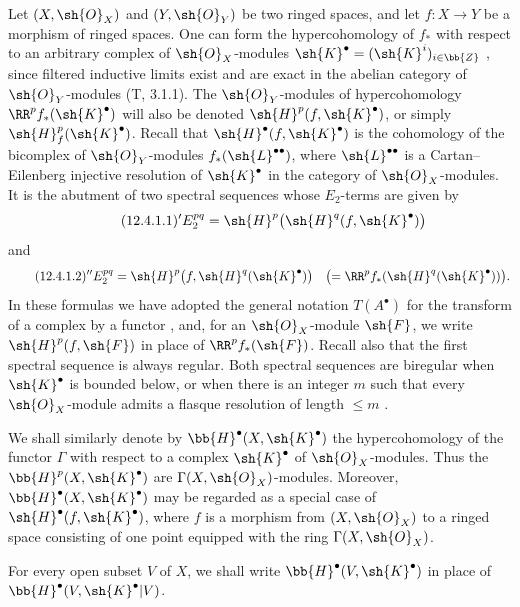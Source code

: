 \begin{env}[12.4.1]
\label{0.12.4.1}
Let $(X,\sh{O}_X)$ and $(Y,\sh{O}_Y)$ be two ringed spaces, and let
$f:X\longrightarrow Y$ be a morphism of ringed spaces.
One can form the hypercohomology of $f_*$ with respect to an arbitrary
complex of $\sh{O}_X$-modules
$\sh{K}^\bullet=(\sh{K}^i)_{i\in\bb{Z}}$
, since filtered inductive limits exist and are exact in
the abelian category of $\sh{O}_Y$-modules (T, 3.1.1).
The $\sh{O}_Y$-modules of hypercohomology
$\RR^p f_*(\sh{K}^\bullet)$ will also be denoted
$\sh{H}^p(f,\sh{K}^\bullet)$, or simply
$\sh{H}^p_f(\sh{K}^\bullet)$.
Recall that $\sh{H}^\bullet(f,\sh{K}^\bullet)$ is the cohomology of
the bicomplex of $\sh{O}_Y$-modules $f_*(\sh{L}^{\bullet\bullet})$,
where $\sh{L}^{\bullet\bullet}$ is a Cartan--Eilenberg injective
resolution of $\sh{K}^\bullet$ in the category of
$\sh{O}_X$-modules.
It is the abutment of two spectral sequences whose $E_2$-terms are
given by
\begin{equation}
\label{0.12.4.1.1}
\tag{12.4.1.1}
  {}'E_2^{pq}
  =\sh{H}^p\bigl(\sh{H}^q(f,\sh{K}^\bullet)\bigr)
\end{equation}
and
\begin{equation}
\label{0.12.4.1.2}
\tag{12.4.1.2}
  {}''E_2^{pq}
  =\sh{H}^p\bigl(f,\sh{H}^q(\sh{K}^\bullet)\bigr)
  \quad
  \bigl(=\RR^p f_*(\sh{H}^q(\sh{K}^\bullet))\bigr).
\end{equation}
In these formulas we have adopted the general notation $T(A^\bullet)$
for the transform of a complex by a functor , and, for
an $\sh{O}_X$-module $\sh{F}$, we write
$\sh{H}^p(f,\sh{F})$ in place of $\RR^p f_*(\sh{F})$.
Recall also that the first spectral sequence is always regular.
Both spectral sequences are biregular when $\sh{K}^\bullet$ is
bounded below,
or when there is an integer $m$ such that every $\sh{O}_X$-module
admits a flasque resolution of length $\leq m$ .
\end{env}

\begin{env}[12.4.2]
\label{0.12.4.2}
We shall similarly denote by $\bb{H}^\bullet(X,\sh{K}^\bullet)$ the
hypercohomology of the functor $\Gamma$ with respect to a complex
$\sh{K}^\bullet$ of $\sh{O}_X$-modules.
Thus the $\bb{H}^p(X,\sh{K}^\bullet)$ are
$\Gamma(X,\sh{O}_X)$-modules.
Moreover, $\bb{H}^\bullet(X,\sh{K}^\bullet)$ may be regarded as a
special case of $\sh{H}^\bullet(f,\sh{K}^\bullet)$, where $f$ is a
morphism from $(X,\sh{O}_X)$ to a ringed space consisting of one point
equipped with the ring $\Gamma(X,\sh{O}_X)$.

For every open subset $V$ of $X$, we shall write
$\bb{H}^\bullet(V,\sh{K}^\bullet)$ in place of
$\bb{H}^\bullet(V,\sh{K}^\bullet|V)$.
\end{env}

